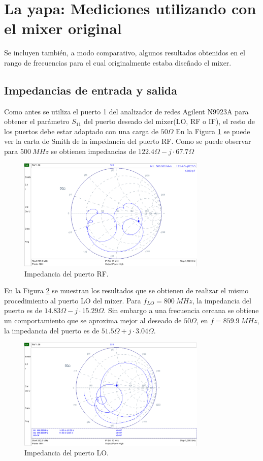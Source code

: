 \documentclass[a4paper,10pt]{article}
\title{  }
\begin{document}
\section{La yapa: Mediciones utilizando con el mixer original}
	Se incluyen tambi\'en, a modo comparativo, algunos resultados obtenidos en el rango de frecuencias para el cual originalmente estaba dise\~nado el mixer.
	\subsection{Impedancias de entrada y salida}
	\indent Como antes se utiliza el puerto 1 del analizador de redes Agilent N9923A para obtener el par\'ametro $S_{11}$ del puerto deseado del mixer(LO, RF o IF), el resto de los puertos debe estar adaptado con una carga de $50\Omega$
	\indent En la Figura \ref{impedancia1fran} se puede ver la carta de Smith 
	de la impedancia del puerto RF. Como se puede observar para $500~MHz$ se obtienen impedancias de $122.4\Omega-j\cdot67.7\Omega$
	
	\begin{figure}[!htb]
		\centering
		\includegraphics[width=9cm]{Images/impRFvieja.png}
		\caption{Impedancia del puerto RF.}
		\label{impedancia1fran}
	\end{figure}
	
	\indent En la Figura \ref{impedancia2fran} se muestran los resultados que se obtienen de realizar el mismo procedimiento al puerto LO del mixer. 
	Para $f_{LO}=800~MHz$, la impedancia del puerto es de 
	$14.83\Omega-j\cdot15.29\Omega$. Sin embargo a una frecuencia cercana se obtiene un comportamiento que se aproxima mejor al deseado de $50\Omega$, en $f=859.9~MHz$, la impedancia del puerto es de $51.5\Omega+j\cdot3.04\Omega$.
	
	\begin{figure}[!htb]
		\centering
		\includegraphics[width=9cm]{Images/impLOvieja.png}
		\caption{Impedancia del puerto LO.}
		\label{impedancia2fran}		
	\end{figure}
\end{document}

